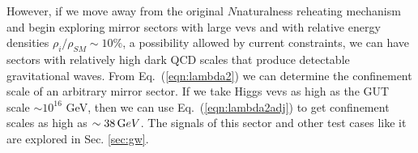 \documentclass[nofootinbib,twocolumn,preprintnumbers]{revtex4-1}
\begin{document}
However, if we move away from the original $N$naturalness reheating mechanism and begin exploring mirror sectors with large vevs and with relative energy densities $\rho_i / \rho_{SM} \sim 10\%$, a possibility allowed by current constraints, we can have sectors with relatively high dark QCD scales that produce detectable gravitational waves. From Eq.~(\ref{eqn:lambda2}) we can determine the confinement scale of an arbitrary mirror sector. If we take Higgs vevs as high as the GUT scale $\sim 10^{16}$ GeV, then we can use Eq.~(\ref{eqn:lambda2adj}) to get confinement scales as high as $\sim 38 \,{\mathrm GeV}$.  The signals of this sector and other test cases like it are explored in Sec. \ref{sec:gw}. 
\end{document}
